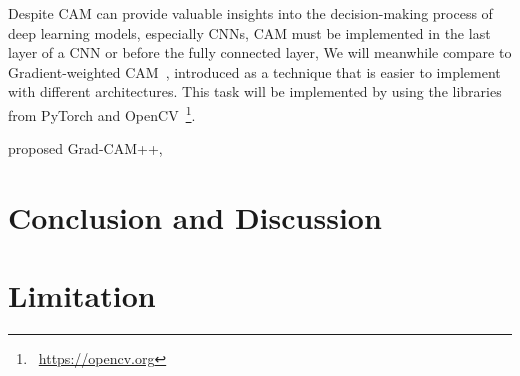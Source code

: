 Despite CAM can provide valuable insights into the decision-making process of deep learning models, especially CNNs, 
CAM must be implemented in the last layer of a CNN or before the fully connected layer, 
We will meanwhile compare to Gradient-weighted CAM~\cite{SelvarajuCDVPB17}, 
introduced as a technique that is easier to implement with different architectures.
This task will be implemented by using the libraries from PyTorch and OpenCV~\footnote{~\url{https://opencv.org}}.

\citet{chattopadhay2018grad} proposed Grad-CAM++,

\section{Conclusion and Discussion}
\label{sec:conclusion}

\section{Limitation}
\label{sec:limitation}

